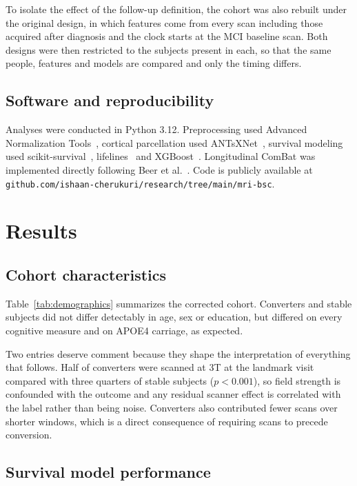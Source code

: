 \documentclass[blue]{ludusofficial}  %
\begin{document}
To isolate the effect of the follow-up definition, the cohort was also rebuilt under the original design, in which features come from every scan including those acquired after diagnosis and the clock starts at the MCI baseline scan. Both designs were then restricted to the subjects present in each, so that the same people, features and models are compared and only the timing differs.

\subsection{Software and reproducibility}

Analyses were conducted in Python 3.12. Preprocessing used Advanced Normalization Tools~\cite{avants2011ants}, cortical parcellation used ANTsXNet~\cite{tustison2021antsxnet}, survival modeling used scikit-survival~\cite{polsterl2020sksurv}, lifelines~\cite{davidson-pilon2019lifelines} and XGBoost~\cite{chen2016xgboost}. Longitudinal ComBat was implemented directly following Beer et al.~\cite{beer2020longitudinal}. Code is publicly available at \texttt{github.com/ishaan-cherukuri/research/tree/main/mri-bsc}.

\section{Results}

\subsection{Cohort characteristics}


Table~\ref{tab:demographics} summarizes the corrected cohort. Converters and stable subjects did not differ detectably in age, sex or education, but differed on every cognitive measure and on APOE4 carriage, as expected.

Two entries deserve comment because they shape the interpretation of everything that follows. Half of converters were scanned at 3T at the landmark visit compared with three quarters of stable subjects ($p<0.001$), so field strength is confounded with the outcome and any residual scanner effect is correlated with the label rather than being noise. Converters also contributed fewer scans over shorter windows, which is a direct consequence of requiring scans to precede conversion.

\subsection{Survival model performance}
\end{document}
